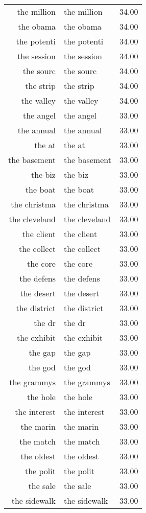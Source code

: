 \begin{table}[ht]
\begin{tabular}{rlr}
  the million & the million & 34.00 \\ 
  the obama & the obama & 34.00 \\ 
  the potenti & the potenti & 34.00 \\ 
  the session & the session & 34.00 \\ 
  the sourc & the sourc & 34.00 \\ 
  the strip & the strip & 34.00 \\ 
  the valley & the valley & 34.00 \\ 
  the angel & the angel & 33.00 \\ 
  the annual & the annual & 33.00 \\ 
  the at & the at & 33.00 \\ 
  the basement & the basement & 33.00 \\ 
  the biz & the biz & 33.00 \\ 
  the boat & the boat & 33.00 \\ 
  the christma & the christma & 33.00 \\ 
  the cleveland & the cleveland & 33.00 \\ 
  the client & the client & 33.00 \\ 
  the collect & the collect & 33.00 \\ 
  the core & the core & 33.00 \\ 
  the defens & the defens & 33.00 \\ 
  the desert & the desert & 33.00 \\ 
  the district & the district & 33.00 \\ 
  the dr & the dr & 33.00 \\ 
  the exhibit & the exhibit & 33.00 \\ 
  the gap & the gap & 33.00 \\ 
  the god & the god & 33.00 \\ 
  the grammys & the grammys & 33.00 \\ 
  the hole & the hole & 33.00 \\ 
  the interest & the interest & 33.00 \\ 
  the marin & the marin & 33.00 \\ 
  the match & the match & 33.00 \\ 
  the oldest & the oldest & 33.00 \\ 
  the polit & the polit & 33.00 \\ 
  the sale & the sale & 33.00 \\ 
  the sidewalk & the sidewalk & 33.00 \\ 

\end{tabular}
\end{table}
